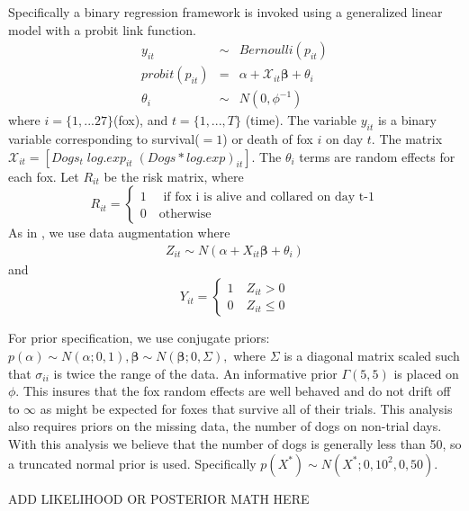 \documentclass[aoas,preprint]{imsart}
\numberwithin{equation}{section}
\theoremstyle{plain}
\begin{document}
Specifically a binary regression framework is invoked using a generalized linear model with a probit link function.
\begin{eqnarray}
y_{it} &\sim& Bernoulli(p_{it}) \\
probit(p_{it}) & = & \alpha + \mathcal{X}_{it}\boldsymbol{\beta} + \theta_{i} \\
\theta_{i} &\sim& N(0, \phi^{-1})
\end{eqnarray}
where $i = \{1,...27\} $(fox), and $t= \{1,...,T\}$ (time). The variable $y_{it}$ is a binary variable corresponding to survival($=1$) or death of fox $i$ on day $t$. The matrix $\mathcal{X}_{it} = [Dogs_t\; log.exp_{it}\; (Dogs*log.exp)_{it}].$ The $\theta_i$ terms are random effects for each fox. Let $R_{it}$ be the risk matrix, where
\[
    R_{it}=\left\{
                \begin{array}{ll}
                  1 \quad \text{ if fox i is alive and collared on day t-1}\\
                  0 \quad \text{otherwise}
                \end{array}
              \right.
  \]
  As in \cite{albert}, we use data augmentation where 
  \begin{eqnarray}
  Z_{it} \sim N( \alpha + X_{it}\boldsymbol{\beta} +\theta_{i})
  \end{eqnarray}
  and
\[
    Y_{it}=\left\{
                \begin{array}{ll}
                  1 \quad  Z_{it} > 0\\
                  0 \quad Z_{it} \leq 0
                \end{array}
              \right.
  \]
  
  For prior specification, we use conjugate priors: $p(\alpha) \sim N(\alpha;0,1), \boldsymbol{\beta} \sim N(\boldsymbol{\beta};0,\Sigma),$ where $\Sigma$ is a diagonal matrix scaled such that $\sigma_{ii}$ is twice the range of the data. An informative prior $\Gamma(5,5)$ is placed on $\phi$. This insures that the fox random effects are well behaved and do not drift off to $\infty$ as might be expected for foxes that survive all of their trials. This analysis also requires priors on the missing data, the number of dogs on non-trial days. With this analysis we believe that the number of dogs is generally less than 50, so a truncated normal prior is used. Specifically $p(X^{*}) \sim N(X^{*}; 0 ,10^2,0,50)$.
  
  ADD LIKELIHOOD OR POSTERIOR MATH HERE

  
\end{document}
